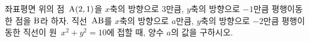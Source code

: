 좌표평면 위의 점~$\mathrm{A}(2{,}\mkern3mu 1)$을 $x$축의 방향으로 $3$만큼, $y$축의 방향으로 $-1$만큼 평행이동한 점을 $\mathrm{B}$라 하자. 직선~$\mathrm{AB}$를 $x$축의 방향으로 $a$만큼, $y$축의 방향으로 $-2$만큼 평행이동한 직선이 원~$x^2+y^2=10$에 접할 때, 양수 $a$의 값을 구하시오.
